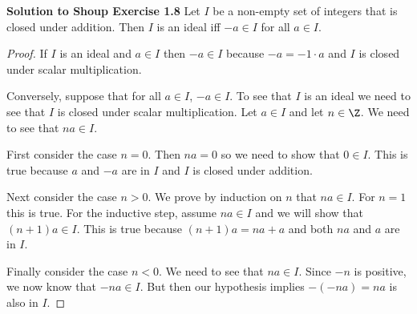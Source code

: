 \documentclass[oneside,12pt]{amsart}
\begin{document}
\bigskip

\textbf{Solution to Shoup Exercise 1.8} Let $I$ be a non-empty set of integers that is closed under addition. Then $I$ is an ideal iff $-a\in I$ for all $a\in I$.
\begin{proof}
If $I$ is an ideal and $a\in I$ then $-a\in I$ because $-a = -1 \cdot a$ and $I$ is closed under scalar multiplication.

Conversely, suppose that for all $a\in I$, $-a\in I$. To see that $I$ is an ideal we need to see that $I$ is closed under scalar multiplication.
Let $a\in I$ and let $n\in \Z$. We need to see that $na\in I$.

First consider the case $n=0$. Then $na=0$ so we need to show that $0\in I$. This is true because $a$ and $-a$ are in $I$ and $I$ is closed under addition.

Next consider the case $n>0$. We prove by induction on $n$ that $na\in I$. For $n=1$ this is true. For the inductive step, assume $na\in I$ and we will show that $(n+1)a\in I$. This is true because $(n+1)a= na +a$ and both $na$ and $a$ are in $I$.

Finally consider the case $n<0$. We need to see that $na\in I$. Since $-n$ is positive, we now know that $-na\in I$. But then our hypothesis implies $-(-na)=na$ is also in $I$.
\end{proof}

\bigskip
\end{document}
